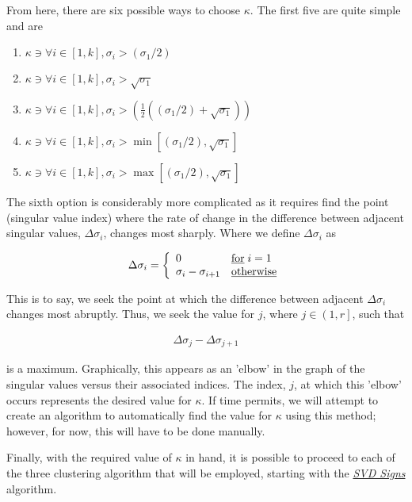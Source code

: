 \documentclass[../../ClusteringConnectionsMAIN.tex]{subfiles}
\begin{document}
\begin{flushleft}
\begin{large}

From here, there are six possible ways to choose $\kappa$.  The first five are quite simple and are

\begin{enumerate}
\item $\kappa \ni \forall i \in \left[ 1, k \right], \sigma_i > \left( \sigma_1 / 2 \right)$
\item $\kappa \ni \forall i \in \left[ 1, k \right], \sigma_i > \sqrt{\sigma_1}$
\item $\kappa \ni \forall i \in \left[ 1, k \right], \sigma_i > \left( \frac{1}{2} \left( \left( \sigma_1 / 2 \right) + \sqrt{\sigma_1} \right) \right)$
\item $\kappa \ni \forall i \in \left[ 1, k \right], \sigma_i > \min \left[ \left( \sigma_1 / 2 \right), \sqrt{\sigma_1} \right]$
\item $\kappa \ni \forall i \in \left[ 1, k \right], \sigma_i > \max \left[ \left( \sigma_1 / 2 \right), \sqrt{\sigma_1} \right]$
\end{enumerate}

The sixth option is considerably more complicated as it requires find the point (singular value index) where the rate of change in the difference between adjacent singular values, $\Delta \sigma_i$, changes most sharply.  Where we define $\Delta \sigma_i$ as

\begin{align}
\Delta \sigma_i = \left\{
\begin{array}{l l}
	0 & \text{\underline{for}} \; i = 1 \\
	\sigma_i - \sigma_{i + 1} & \text{\underline{otherwise}}
\end{array} \right.
\end{align}

This is to say, we seek the point at which the difference between adjacent $\Delta \sigma_i$ changes most abruptly.  Thus, we seek the value for $j$, where $j \in \left( 1, r \right]$, such that

\begin{align*}
\Delta \sigma_j - \Delta \sigma_{j + 1}
\end{align*}

is a maximum.  Graphically, this appears as an 'elbow' in the graph of the singular values versus their associated indices.  The index, $j$, at which this 'elbow' occurs represents the desired value for $\kappa$.  If time permits, we will attempt to create an algorithm to automatically find the value for $\kappa$ using this method; however, for now, this will have to be done manually.  \newline

Finally, with the required value of $\kappa$ in hand, it is possible to proceed to each of the three clustering algorithm that will be employed, starting with the \emph{\underline{SVD Signs}} algorithm.


\end{large}
\end{flushleft}
\end{document}
